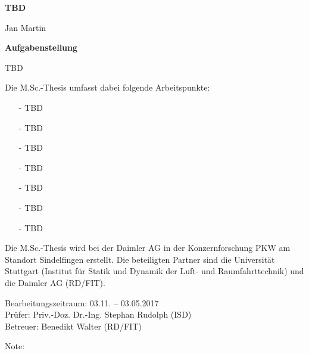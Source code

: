 %


\begingroup
\begin{sloppy}
	{\centering\textbf{\large TBD}
		
		\vspace{6pt}
		{Jan Martin}
		\vspace{20pt}
		
		\textbf{\normalsize Aufgabenstellung}}
	
	\vspace{12pt}
	TBD
	
	\vspace{12pt}
	Die M.Sc.-Thesis umfasst dabei folgende Arbeitspunkte:
	\begin{itemize}
		\setlength{\itemsep}{-3pt}
		\item[-] TBD
		\item[-] TBD
		\item[-] TBD
		\item[-] TBD
		\item[-] TBD
		\item[-] TBD
		\item[-] TBD
	\end{itemize}
	
	Die M.Sc.-Thesis wird bei der Daimler AG in der Konzernforschung PKW am Standort Sindelfingen erstellt. Die beteiligten Partner sind die Universität Stuttgart (Institut für Statik und Dynamik der Luft- und Raumfahrttechnik) und die Daimler AG (RD/FIT).
	
	\vspace{12pt}
	Bearbeitungszeitraum: 03.11. -- 03.05.2017\\
	Prüfer: Priv.-Doz. Dr.-Ing. Stephan Rudolph (ISD)\\
	Betreuer: Benedikt Walter (RD/FIT)
	
	
	\vspace{12pt}
	Note:
\end{sloppy}


\endgroup
